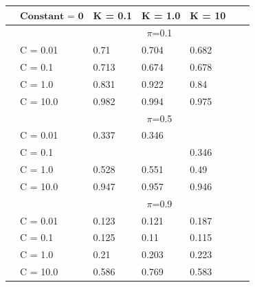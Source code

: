 \documentclass[english]{report}
\begin{document}
\begin{table}[H]
    \centering
    \begin{tabular}{ll|lllll}
        \hline
                                &  $\textbf{Constant = 0}$       & K = 0.1 & K = 1.0 & K = 10 \\ \hline
                                & & \multicolumn{3}{c}{$\pi$=0.1} \\ \hline
                                & C = 0.01   & 0.71 & 0.704 & 0.682    \\
                                & C = 0.1    & 0.713 & 0.674 & 0.678  \\
                                & C = 1.0    & 0.831 & 0.922 & 0.84    \\
                                & C = 10.0   & 0.982 & 0.994 & 0.975  \\ \hline

                                & & \multicolumn{3}{c}{$\pi$=0.5} \\ \hline
                                & C = 0.01   & 0.337 & 0.346 & \color{red}{0.342}   \\
                                & C = 0.1    & \color{red}{0.324} & \color{red}{0.344} & 0.346  \\
                                & C = 1.0    & 0.528 & 0.551 & 0.49    \\
                                & C = 10.0   & 0.947 & 0.957 & 0.946  \\ \hline

                                & & \multicolumn{3}{c}{$\pi$=0.9} \\ \hline
                                & C = 0.01   & 0.123 & 0.121 & 0.187  \\
                                & C = 0.1    & 0.125 & 0.11 & 0.115  \\
                                & C = 1.0    & 0.21 & 0.203 & 0.223    \\
                                & C = 10.0   & 0.586 & 0.769 & 0.583  \\ 
    \hline
    \end{tabular}
    \label{tab:PolySVM_c0_valid}
\end{table}
\end{document}
